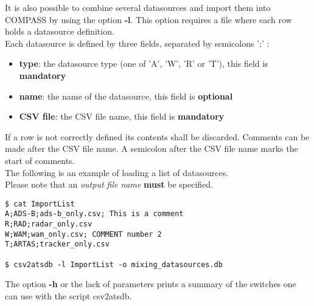 It is also possible to combine several datasources and import them into COMPASS by using the option \textbf{-l}. This option requires a file where each row holds a datasource definition. \\

Each datasource is defined by three fields, separated by semicolons ';' :
\begin{itemize}
\item \textbf{type}: the datasource type (one of 'A', 'W', 'R' or 'T'), this field is \textbf{mandatory}
\item \textbf{name}: the name of the datasource, this field is \textbf{optional}
\item \textbf{CSV file}: the CSV file name, this field is \textbf{mandatory}
\\
\end{itemize}

If a row is not correctly defined its contents shall be discarded. Comments can be made after the CSV file name. A semicolon after the CSV file name marks the start of comments. \\

The following is an example of loading a list of datasources. \\
Please note that an \textit{output file name} \textbf{must} be specified.

\begin{lstlisting}
$ cat ImportList
A;ADS-B;ads-b_only.csv; This is a comment
R;RAD;radar_only.csv
W;WAM;wam_only.csv; COMMENT number 2
T;ARTAS;tracker_only.csv

$ csv2atsdb -l ImportList -o mixing_datasources.db
\end{lstlisting}

The option \textbf{-h} or the lack of parameters prints a summary of the switches one can use with the script csv2atsdb.


